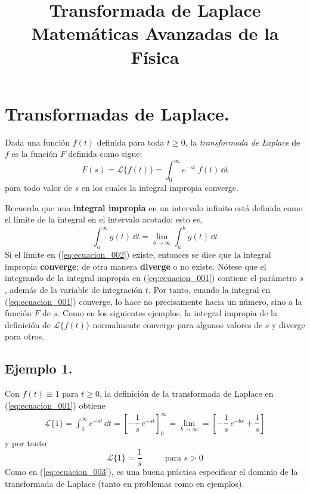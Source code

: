 
\author{}
\title{Transformada de Laplace \\ {\large Matemáticas Avanzadas de la Física}\vspace{-1.5\baselineskip}}
\date{ }

\maketitle
\fontsize{14}{14}\selectfont
\section{Transformadas de Laplace.}
Dada una función $f(t)$ definida para toda $t \geq 0$, la \emph{transformada de Laplace} de $f$ es la función $F$ definida como sigue:
\begin{equation}
F(s) = \mathscr{L} \{ f(t) \} = \int_{0}^{\infty} e^{-st} \; f(t) \, \dd{t}
\label{eq:ecuacion_001}
\end{equation}
para todo valor de $s$ en los cuales la integral impropia converge.
\par
Recuerda que una \textbf{integral impropia} en un intervalo infinito está definida como el límite de la integral en el intervalo acotado; esto es,
\begin{equation}
\int_{a}^{\infty} g(t) \, \dd{t} = \lim_{b \to \infty} \int_{a}^{b} g(t) \, \dd{t}
\label{eq:ecuacion_002}
\end{equation}
Si el límite en (\ref{eq:ecuacion_002}) existe, entonces se dice que la integral impropia \textbf{converge}; de otra manera \textbf{diverge} o no existe. Nótese que el integrando de la integral impropia en (\ref{eq:ecuacion_001}) contiene el parámetro $s$, además de la variable de integración $t$. Por tanto, cuando la integral en (\ref{eq:ecuacion_001}) converge, lo hace no precisamente hacia un número, sino a la función $F$ de $s$. Como en los siguientes ejemplos, la integral impropia de la definición de $\mathscr{L} \{ f(t) \} $ normalmente converge para algunos valores de $s$ y diverge para otros.
\subsection*{Ejemplo 1.}
Con $f(t) \equiv 1$ para $t \geq 0$, la definición de la transformada de Laplace en (\ref{eq:ecuacion_001}) obtiene
\begin{align*}
\mathscr{L} \{ 1 \} = \int_{0}^{\infty} e^{-st} \, \dd{t} = \left[ - \dfrac{1}{s} \, e^{-st} \right]_{0}^{\infty} = \lim_{b \to \infty} = \left[ - \dfrac{1}{s} \, e^{-bs} + \dfrac{1}{s} \right]
\end{align*}
y por tanto
\begin{equation}
\mathscr{L} \{ 1 \} = \dfrac{1}{s} \hspace{1cm} \mbox{ para } s > 0
\label{eq:ecuacion_003}
\end{equation}
Como en (\ref{eq:ecuacion_003}), es una buena práctica especificar el dominio de la transformada de Laplace (tanto en problemas como en ejemplos).
